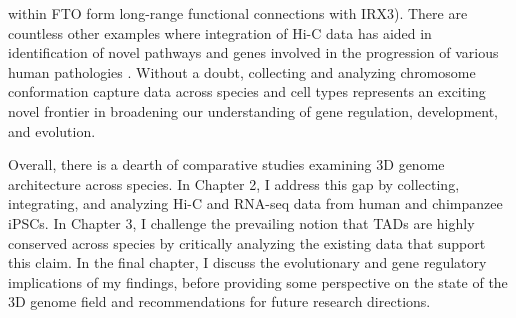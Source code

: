 {within FTO form long-range functional connections with IRX3)}. There are countless other examples where integration of Hi-C data has aided in identification of novel pathways and genes involved in the progression of various human pathologies \cite{Martin et al. 2015 (Capture Hi-C reveals novel candidate genes and complex long-range interactions with related autoimmune risk loci), Martin et al. 2016 (Identifying Causal Genes at the Multiple Sclerosis Associated Region 6q23 Using Capture Hi-C), Matoba et al. 2020 (Mapping Alzheimer's Disease Variants to Their Target Genes Using Computational Analysis of Chromatin Configuration), Wu and Pan 2018 (Integration of Enhancer-Promoter Interactions with GWAS Summary Results Identifies Novel Schizophrenia-Associated Genes and Pathways)}. Without a doubt, collecting and analyzing chromosome conformation capture data across species and cell types represents an exciting novel frontier in broadening our understanding of gene regulation, development, and evolution.

Overall, there is a dearth of comparative studies examining 3D genome architecture across species. In Chapter 2, I address this gap by collecting, integrating, and analyzing Hi-C and RNA-seq data from human and chimpanzee iPSCs. In Chapter 3, I challenge the prevailing notion that TADs are highly conserved across species by critically analyzing the existing data that support this claim. In the final chapter, I discuss the evolutionary and gene regulatory implications of my findings, before providing some perspective on the state of the 3D genome field and recommendations for future research directions.